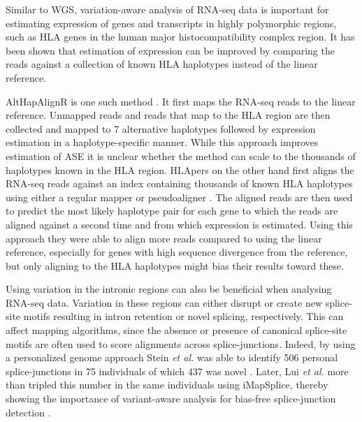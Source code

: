 Similar to WGS, variation-aware analysis of RNA-seq data is important for estimating expression of genes and transcripts in highly polymorphic regions, such as HLA genes in the human major histocompatibility complex region. 
It has been shown that estimation of expression can be improved by comparing the reads against a collection of known HLA haplotypes instead of the linear reference.

AltHapAlignR is one such method \cite{Lee2018-mm}. It first maps the RNA-seq reads to the linear reference. Unmapped reads and reads that map to the HLA region are then collected and mapped to 7 alternative haplotypes followed by expression estimation in a haplotype-specific manner. 
While this approach improves estimation of ASE it is unclear whether the method can scale to the thousands of haplotypes known in the HLA region.
HLApers on the other hand first aligns the RNA-seq reads against an index containing thousands of known HLA haplotypes using either a regular mapper or pseudoaligner \cite{Aguiar2019-fy}.
The aligned reads are then used to predict the most likely haplotype pair for each gene to which the reads are aligned against a second time and from which expression is estimated.  
Using this approach they were able to align more reads compared to using the linear reference, especially for genes with high sequence divergence from the reference, but only aligning to the HLA haplotypes might bias their results toward these. 

Using variation in the intronic regions can also be beneficial when analysing RNA-seq data. 
Variation in these regions can either disrupt or create new splice-site motifs resulting in intron retention or novel splicing, respectively. 
This can affect mapping algorithms, since the absence or presence of canonical splice-site motifs are often used to score alignments across splice-junctions. 
Indeed, by using a personalized genome approach Stein \textit{et al.} was able to identify 506 personal splice-junctions in 75 individuals of which 437 was novel \cite{Stein_2015}. 
Later, Lui \textit{et al.} more than tripled this number in the same individuals using iMapSplice, thereby showing the importance of variant-aware analysis for bias-free splice-junction detection \cite{Liu_2018}.



